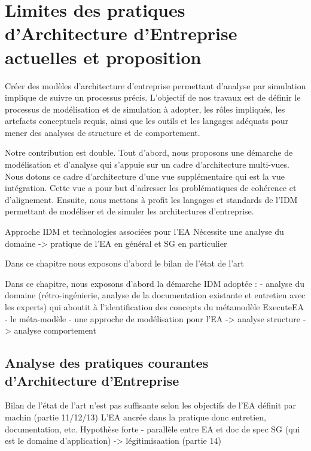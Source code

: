 \chapter[Limites des pratiques d'Architecture d'Entreprise]{Limites des pratiques d'Architecture d'Entreprise actuelles et proposition}
\label{ch:demarche}

\PartialToc



Créer des modèles d'architecture d'entreprise permettant d'analyse par
simulation implique de suivre un processus précis. L'objectif de nos travaux est
de définir le processus de modélisation et de simulation à adopter, les rôles
impliqués, les artefacts conceptuels requis, ainsi que les outils et les
langages adéquats pour mener des analyses de structure et de comportement.

Notre contribution est double. Tout d'abord, nous proposons une démarche de
modélisation et d'analyse qui s'appuie sur un cadre d'architecture multi-vues.
Nous dotons ce cadre d'architecture d'une vue supplémentaire qui est la vue
intégration. Cette vue a pour but d'adresser les problématiques de cohérence et
d'alignement. Ensuite, nous mettons à profit les langages et standards de l'IDM
permettant de modéliser et de simuler les architectures d'entreprise.

	Approche IDM et technologies associées pour l'EA Nécessite une analyse du
	domaine -> pratique de l'EA en général et SG en particulier


Dans ce chapitre nous exposons d'abord le bilan de l'état de l'art


Dans ce chapitre, nous exposons d'abord la démarche IDM adoptée :
- analyse du domaine (rétro-ingénierie, analyse de la documentation existante et entretien avec les experts) qui aboutit à l'identification des concepts du métamodèle ExecuteEA
- le méta-modèle
- une approche de modélisation pour l'EA
-> analyse structure
-> analyse comportement

\section[Analyse des pratiques actuelles d'Architecture d'Entreprise]{Analyse des pratiques courantes \\ d'Architecture d'Entreprise}
	Bilan de l'état de l'art n'est pas suffisante selon les objectifs de l'EA
	définit par machin (partie 11/12/13) L'EA ancrée dans la pratique donc
	entretien, documentation, etc. Hypothèse forte - parallèle entre EA et doc
	de spec SG (qui est le domaine d'application) -> légitimisaation (partie 14)


